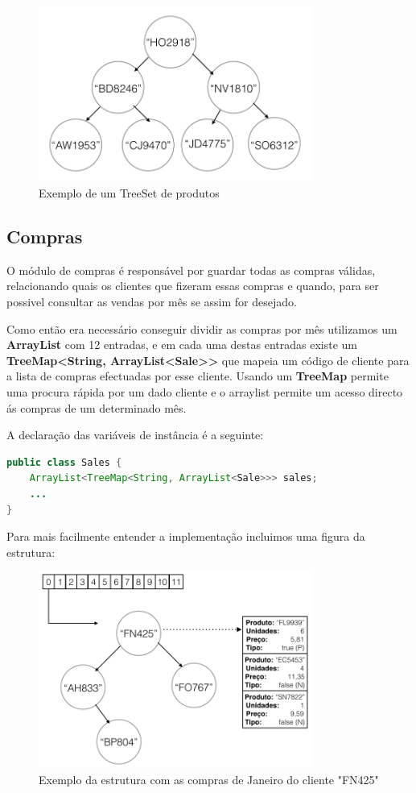 \documentclass[10pt] {article}
\begin{document}
\begin{figure}[ht!]
\centering
\includegraphics[width=90mm]{catprodutos.png}
\caption{Exemplo de um TreeSet de produtos}
\label{fig:catprodutos}
\end{figure}

\subsection{Compras}
\par O módulo de compras é responsável por guardar todas as compras válidas, relacionando quais os clientes que fizeram 
essas compras e quando, para ser possivel consultar as vendas por mês se assim for desejado.
\par Como então era necessário conseguir dividir as compras por mês utilizamos um \textbf{ArrayList} com 12 entradas, e 
em cada uma destas entradas existe um \textbf{TreeMap\textless String, ArrayList\textless Sale\textgreater\textgreater} que 
mapeia um código de cliente para a lista de compras efectuadas por esse cliente. Usando um \textbf{TreeMap} permite uma 
procura rápida por um dado cliente e o arraylist permite um acesso directo ás compras de um determinado mês.
\par A declaração das variáveis de instância é a seguinte:

\begin{lstlisting}[language=Java]
public class Sales {
	ArrayList<TreeMap<String, ArrayList<Sale>>> sales;
	...
}
\end{lstlisting}

\par Para mais facilmente entender a implementação incluimos uma figura da estrutura:

\begin{figure}[ht!]
\centering
\includegraphics[width=90mm]{sales.png}
\caption{Exemplo da estrutura com as compras de Janeiro do cliente "FN425"}
\label{fig:sales}
\end{figure}
\end{document}
